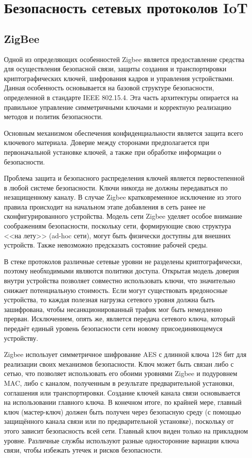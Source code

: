 \chapter{Безопасность сетевых протоколов IoT}

	\section{ZigBee}
	Одной из определяющих особенностей Zigbee является предоставление средства для осуществления 
	безопасной связи, защиты создания и транспортировки криптографических ключей, шифрования кадров 
	и управления устройствами. Данная особенность основывается на базовой структуре безопасности, определенной в 
	стандарте IEEE 802.15.4. Эта часть архитектуры опирается на правильное управление симметричными 
	ключами и корректную реализацию методов и политик безопасности.
	
	Основным механизмом обеспечения конфиденциальности является защита всего ключевого материала. 
	Доверие между сторонами предполагается при первоначальной установке ключей, а также при обработке 
	информации о безопасности.
	
	Проблема защита и безопасного распределения ключей является первостепенной в любой системе
	безопасности. Ключи никогда не должны передаваться по незащищенному каналу. В случае Zigbee 
	кратковременное исключение из этого правила происходит на начальном этапе добавления в сеть 
	ранее не сконфигурированного устройства. Модель сети Zigbee уделяет особое внимание соображениям
	безопасности, поскольку сети, формирующие свою структура <<на лету>> (ad-hoc сети), могут быть 
	физически доступны для внешних устройств. Также невозможно предсказать состояние рабочей среды.
	
	В стеке протоколов различные сетевые уровни не разделены криптографически, поэтому необходимыми 
	являются политики доступа. Открытая модель доверия внутри устройства позволяет совместно использовать 
	ключи, что значительно снижает потенциальную стоимость. Если могут существовать вредоносные устройства, 
	то каждая полезная нагрузка сетевого уровня должна быть зашифрована, чтобы несанкционированный 
	трафик мог быть немедленно прерван. Исключением, опять же, является передача сетевого ключа, 
	который передаёт единый уровень безопасности сети новому присоединяющемуся устройству.
	
	Zigbee использует симметричное шифрование AES с длинной ключа 128 бит для реализации своих механизмов 
	безопасности. Ключ может быть связан либо с сетью, что позволяет использовать его обоими уровнями 
	Zigbee и подуровнем MAC, либо с каналом, полученным в результате предварительной установки, соглашения 
	или транспортировки. Создание ключей канала связи основывается на использовании главного ключа. 
	В конечном итоге, по крайней мере, главный ключ (мастер-ключ) должен быть получен через безопасную 
	среду (с помощью защищённого канала связи или по предварительной установке), поскольку от этого 
	зависит безопасность всей сети. Главный ключ виден только на прикладном уровне. Различные службы 
	используют разные односторонние вариации ключа связи, чтобы избежать утечек и рисков безопасности.
	
